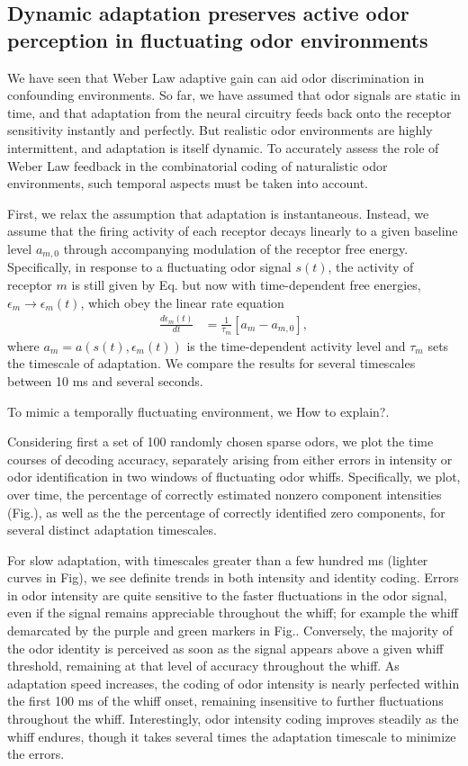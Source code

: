 \subsection{Dynamic adaptation preserves active odor perception in fluctuating odor environments}
We have seen that Weber Law adaptive gain can aid odor discrimination in confounding environments. So far, we have assumed that odor signals are static in time, and that adaptation from the neural circuitry feeds back onto the receptor sensitivity instantly and perfectly. But realistic odor environments are highly intermittent, and adaptation is itself dynamic. To accurately assess the role of Weber Law feedback in the combinatorial coding of naturalistic odor environments, such temporal aspects must be taken into account. 

First, we relax the assumption that adaptation is instantaneous. Instead, we assume that the firing activity of each receptor decays linearly to a given baseline level $a_{m, 0}$ through accompanying modulation of the receptor free energy. Specifically, in response to a fluctuating odor signal $s(t)$, the activity of receptor $m$ is still given by Eq. but now with time-dependent free energies, $\epsilon_m \rightarrow \epsilon_m(t)$, which obey the linear rate equation
\begin{align}
\frac{d\epsilon_m(t)}{dt} &= \frac{1}{\tau_m}\left[a_m - a_{m,0}\right],
\end{align}
where $a_m = a(s(t), \epsilon_m(t))$ is the time-dependent activity level and $\tau_m$ sets the timescale of adaptation. We compare the results for several timescales between 10 ms and several seconds.

To mimic a temporally fluctuating environment, we {\color{blue} How to explain?}. 


Considering first a set of 100 randomly chosen sparse odors, we plot the time courses of decoding accuracy, separately arising from either errors in intensity or odor identification in two windows of fluctuating odor whiffs. Specifically, we plot, over time, the percentage of correctly estimated nonzero component intensities (Fig.), as well as the the percentage of correctly identified zero components, for several distinct adaptation timescales. 

For slow adaptation, with timescales greater than a few hundred ms (lighter curves in Fig), we see definite trends in both intensity and identity coding. Errors in odor intensity are quite sensitive to the faster fluctuations in the odor signal, even if the signal remains appreciable throughout the whiff; for example the whiff demarcated by the purple and green markers in Fig.. Conversely, the majority of the odor identity is perceived as soon as the signal appears above a given whiff threshold, remaining at that level of accuracy throughout the whiff. As adaptation speed increases, the coding of odor intensity is nearly perfected within the first 100 ms of the whiff onset, remaining insensitive to further fluctuations throughout the whiff. Interestingly, odor intensity coding improves steadily as the whiff endures, though it takes several times the adaptation timescale to minimize the errors. 

